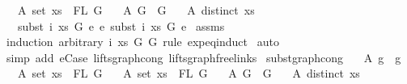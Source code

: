 \begin{isabellebody}
\ \ \ A{}{\isacharcolon}{\kern0pt}\ {\isachardoublequoteopen}set\ xs\ {\isacharequal}{\kern0pt}\ FL\ G{}{\isachardoublequoteclose}\isanewline
\ \ \ A{}{\isacharcolon}{\kern0pt}\ {\isachardoublequoteopen}G{}\ {\isasymsimeq}\ G{}{\isachardoublequoteclose}\isanewline
\ \ \ A{}{\isacharcolon}{\kern0pt}\ {\isachardoublequoteopen}distinct\ xs{\isachardoublequoteclose}\isanewline
\ \ \ {\isachardoublequoteopen}subst\ i\ xs\ G{}\ e{}\ {\isasymsimeq}e\ subst\ i\ xs\ G{}\ e{}{\isachardoublequoteclose}\isanewline
%
\isadelimproof
%
\endisadelimproof
%
\isatagproof
{}\isamarkupfalse%
\ assms\isanewline
{}\isamarkupfalse%
\ {\isacharparenleft}{\kern0pt}induction\ arbitrary{\isacharcolon}{\kern0pt}\ i\ xs\ G{}\ G{}\ rule{\isacharcolon}{\kern0pt}\ expeq{\isachardot}{\kern0pt}induct{\isacharparenright}{\kern0pt}\isanewline
{}\isamarkupfalse%
\ auto\isanewline
{}\isamarkupfalse%
\ {\isacharparenleft}{\kern0pt}simp\ add{\isacharcolon}{\kern0pt}\ e{\isacharunderscore}{\kern0pt}Case\ lifts{\isacharunderscore}{\kern0pt}graph{\isacharunderscore}{\kern0pt}cong\ lifts{\isacharunderscore}{\kern0pt}graph{\isacharunderscore}{\kern0pt}freelinks{\isacharparenright}{\kern0pt}%
\endisatagproof
{\isafoldproof}%
%
\isadelimproof
\isanewline
%
\endisadelimproof
\isanewline
\isanewline
{}\isamarkupfalse%
\ subst{\isacharunderscore}{\kern0pt}graph{\isacharunderscore}{\kern0pt}cong{}{\isacharcolon}{\kern0pt}\isanewline
\ \ \ A{}{\isacharcolon}{\kern0pt}\ {\isachardoublequoteopen}g{}\ {\isasymsimeq}\ g{}{\isachardoublequoteclose}\isanewline
\ \ \ A{}{\isacharcolon}{\kern0pt}\ {\isachardoublequoteopen}set\ xs\ {\isacharequal}{\kern0pt}\ FL\ G{}{\isachardoublequoteclose}\isanewline
\ \ \ A{}{\isacharcolon}{\kern0pt}\ {\isachardoublequoteopen}set\ xs\ {\isacharequal}{\kern0pt}\ FL\ G{}{\isachardoublequoteclose}\isanewline
\ \ \ A{}{\isacharcolon}{\kern0pt}\ {\isachardoublequoteopen}G{}\ {\isasymsimeq}\ G{}{\isachardoublequoteclose}\isanewline
\ \ \ A{}{\isacharcolon}{\kern0pt}\ {\isachardoublequoteopen}distinct\ xs{\isachardoublequoteclose}\isanewline

\end{isabellebody}
